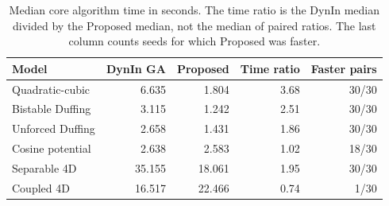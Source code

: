 \begin{table}[htbp]
\centering\small
\caption{Median core algorithm time in seconds. The time ratio is the DynIn median divided by the Proposed median, not the median of paired ratios. The last column counts seeds for which Proposed was faster.}
\label{tab:comparison-cost}
\begin{tabularx}{\linewidth}{@{}Y r r r r@{}}
\toprule
Model & DynIn GA & Proposed & Time ratio & Faster pairs \\
\midrule
Quadratic-cubic & 6.635 & 1.804 & 3.68 & 30/30 \\
Bistable Duffing & 3.115 & 1.242 & 2.51 & 30/30 \\
Unforced Duffing & 2.658 & 1.431 & 1.86 & 30/30 \\
Cosine potential & 2.638 & 2.583 & 1.02 & 18/30 \\
Separable 4D & 35.155 & 18.061 & 1.95 & 30/30 \\
Coupled 4D & 16.517 & 22.466 & 0.74 & 1/30 \\
\bottomrule
\end{tabularx}
\end{table}
